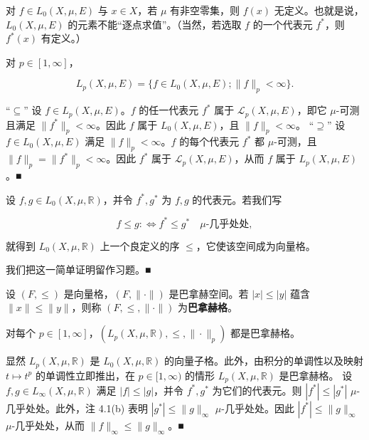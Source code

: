\begin{remark}

\begin{items}
\item

对 $ f \in L_0(X, \mu, E) $ 与 $ x \in X $，若 $ \mu $ 有非空零集，则 $ f(x) $ 无定义。也就是说，$ L_0(X, \mu, E) $ 的元素不能“逐点求值”。（当然，若选取 $ f $ 的一个代表元 $ f^{*} $，则 $ f^{*}(x) $ 有定义。）

\item

对 $ p \in [1, \infty] $，

\[
L_p(X, \mu, E) = \{ f \in L_0(X, \mu, E) ; \|f\|_p < \infty \} .
\]

\proofhead
“$ \subseteq $” 设 $ f \in L_p(X, \mu, E) $。$ f $ 的任一代表元 $ f^{*} $ 属于 $ \mathcal{L}_p(X, \mu, E) $，即它 $ \mu $-可测且满足 $ \|f^{*}\|_p < \infty $。因此 $ f $ 属于 $ L_0(X, \mu, E) $，且 $ \|f\|_p < \infty $。
“$ \supseteq $” 设 $ f \in L_0(X, \mu, E) $ 满足 $ \|f\|_p < \infty $。$ f $ 的每个代表元 $ f^{*} $ 都 $ \mu $-可测，且 $ \|f\|_p = \|f^{*}\|_p < \infty $。因此 $ f^{*} $ 属于 $ \mathcal{L}_p(X, \mu, E) $，从而 $ f $ 属于 $ L_p(X, \mu, E) $。\nobreak\hspace{0.35em}■
\item

设 $ f, g \in L_0(X, \mu, \mathbb{R}) $，并令 $ f^{*}, g^{*} $ 为 $ f, g $ 的代表元。若我们写

\[
f \le g :\iff f^{*} \le g^{*} \quad \mu\text{-几乎处处} ,
\]

就得到 $ L_0(X, \mu, \mathbb{R}) $ 上一个良定义的序 $ \le $，它使该空间成为向量格。

\proofhead
我们把这一简单证明留作习题。\nobreak\hspace{0.35em}■
\item

设 $ (F, \le) $ 是向量格，$ (F, \|\cdot\|) $ 是巴拿赫空间。若 $ |x| \le |y| $ 蕴含 $ \|x\| \le \|y\| $，则称 $ (F, \le, \|\cdot\|) $ 为\textbf{巴拿赫格}。

\item

对每个 $ p \in [1, \infty] $，$ (L_p(X, \mu, \mathbb{R}), \le, \|\cdot\|_p) $ 都是巴拿赫格。

\proofhead
显然 $ L_p(X, \mu, \mathbb{R}) $ 是 $ L_0(X, \mu, \mathbb{R}) $ 的向量子格。此外，由积分的单调性以及映射 $ t \mapsto t^p $ 的单调性立即推出，在 $ p \in [1, \infty) $ 的情形 $ L_p(X, \mu, \mathbb{R}) $ 是巴拿赫格。
设 $ f, g \in L_\infty(X, \mu, \mathbb{R}) $ 满足 $ |f| \le |g| $，并令 $ f^{*}, g^{*} $ 为它们的代表元。则 $ |f^{*}| \le |g^{*}| $ $ \mu $-几乎处处。此外，注 4.1(b) 表明 $ |g^{*}| \le \|g\|_\infty $ $ \mu $-几乎处处。因此 $ |f^{*}| \le \|g\|_\infty $ $ \mu $-几乎处处，从而 $ \|f\|_\infty \le \|g\|_\infty $。\nobreak\hspace{0.35em}■
\end{items}

\end{remark}

